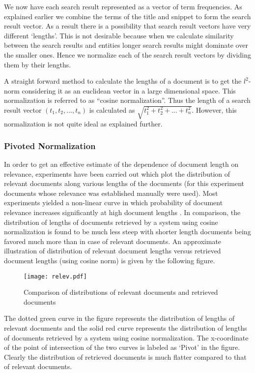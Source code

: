 \documentclass[a4paper,12pt]{report}
\begin{document}
We now have each search result represented as a vector of term
frequencies. As explained earlier we combine the terms of the title
and snippet to form the search result vector. As a result there is a
possibility that search result vectors have very different
`lengths'. This is not desirable because when we calculate similarity
between the search results and entities longer search results might
dominate over the smaller ones. Hence we normalize each of the search
result vectors by dividing them by their lengths.

A straight forward method to calculate the lengths of a document is to
get the $l^2$-norm considering it as an euclidean vector in a large
dimensional space. This normalization is referred to as ``cosine
normalization''. Thus the length of a search result vector
$(t_1,t_2,...,t_n)$ is calculated as $\sqrt{t_1^2 + t_2^2 + ... +
  t_n^2}$. However, this normalization is not quite ideal as explained
further. 

\subsubsection{Pivoted Normalization}

In order to get an effective estimate of the dependence of document
length on relevance, experiments have been carried out which plot the
distribution of relevant documents along various lengths of the
documents (for this experiment documents whose relevance was
established manually were used). Most experiments yielded a non-linear
curve in which probability of document relevance increases
significantly at high document lengths \cite{amit}. In comparison, the
distribution of lengths of documents retrieved by a system using
cosine normalization is found to be much less steep with shorter
length documents being favored much more than in case of relevant
documents. An approximate illustration of distribution of relevant
document lengths versus retrieved document lengths (using cosine norm)
is given by the following figure.
\begin{figure}[h]
  \centering
  \texttt{[image: relev.pdf]}
  \caption{Comparison of distributions of relevant documents and
    retrieved documents}
\end{figure}

The dotted green curve in the figure represents the distribution of
lengths of relevant documents and the solid red curve represents the
distribution of lengths of documents retrieved by a system using
cosine normalization. The x-coordinate of the point of intersection of
the two curves is labeled as `Pivot' in the figure. Clearly the
distribution of retrieved documents is much flatter compared to that
of relevant documents.
\end{document}
